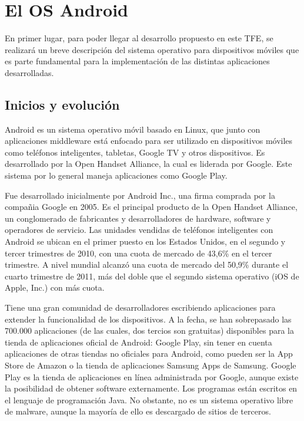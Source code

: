 \chapter{El \ac{OS} Android}

En primer lugar, para poder llegar al desarrollo propuesto en este \ac{TFE}, se realizar\'a un breve descripci\'on del sistema operativo para dispositivos m\'oviles que es parte fundamental para la implementaci\'on de las distintas aplicaciones desarrolladas.

\section{Inicios y evoluci\'on}
\label{sec:android.history.1}

Android es un sistema operativo m\'ovil basado en Linux, que junto con aplicaciones middleware est\'a enfocado para ser utilizado en dispositivos m\'oviles como tel\'efonos inteligentes, tabletas, Google TV y otros dispositivos. Es desarrollado por la Open Handset Alliance, la cual es liderada por Google\Si{\texttrademark}. Este sistema por lo general maneja aplicaciones como Google Play.

Fue desarrollado inicialmente por Android Inc., una firma comprada por la compa\~nia Google\Si{\texttrademark} en 2005. Es el principal producto de la Open Handset Alliance, un conglomerado de fabricantes y desarrolladores de hardware, software y operadores de servicio. Las unidades vendidas de tel\'efonos inteligentes con Android se ubican en el primer puesto en los Estados Unidos, en el segundo y tercer trimestres de 2010, con una cuota de mercado de 43,6\% en el tercer trimestre. A nivel mundial alcanz\'o una cuota de mercado del 50,9\% durante el cuarto trimestre de 2011, m\'as del doble que el segundo sistema operativo (iOS de Apple, Inc.) con m\'as cuota.

Tiene una gran comunidad de desarrolladores escribiendo aplicaciones para extender la funcionalidad de los dispositivos. A la fecha, se han sobrepasado las 700.000 aplicaciones (de las cuales, dos tercios son gratuitas) disponibles para la tienda de aplicaciones oficial de Android: Google Play, sin tener en cuenta aplicaciones de otras tiendas no oficiales para Android, como pueden ser la App Store de Amazon o la tienda de aplicaciones Samsung Apps de Samsung. Google Play es la tienda de aplicaciones en l\'inea administrada por Google, aunque existe la posibilidad de obtener software externamente. Los programas est\'an escritos en el lenguaje de programaci\'on Java. No obstante, no es un sistema operativo libre de malware, aunque la mayor\'ia de ello es descargado de sitios de terceros.

